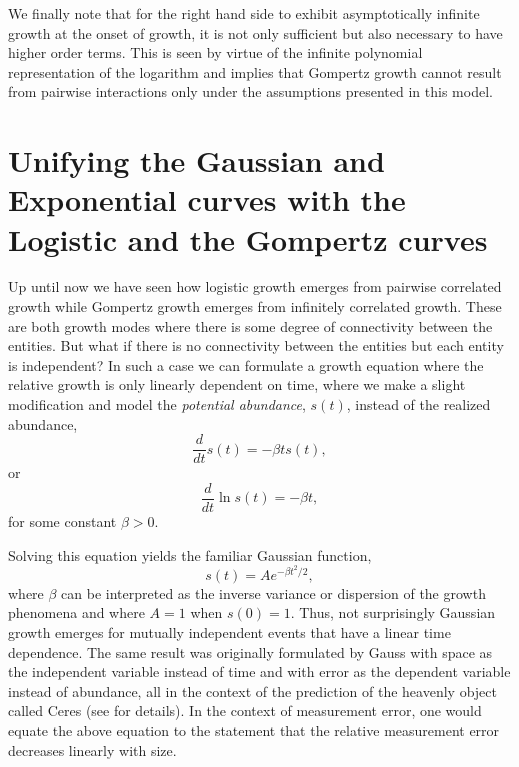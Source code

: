 \documentclass{article}
\begin{document}
We finally note that for the right hand side to exhibit asymptotically infinite growth at the onset of growth, it is not only sufficient but also necessary to have higher order terms. This is seen by virtue of the infinite polynomial representation of the logarithm and implies that Gompertz growth cannot result from pairwise interactions only under the assumptions presented in this model.

\section{Unifying the Gaussian and Exponential curves with the Logistic and the Gompertz curves}

Up until now we have seen how logistic growth emerges from pairwise correlated growth while Gompertz growth emerges from infinitely correlated growth. These are both growth modes where there is some degree of connectivity between the entities. But what if there is no connectivity between the entities but each entity is independent? In such a case we can formulate a growth equation where the relative growth is only linearly dependent on time, where we make a slight modification and model the \textit{potential abundance}, $s(t)$, instead of the realized abundance,
\begin{equation}
  \frac{d}{dt}s(t) = - \beta t s(t),
\end{equation}
or 
\begin{equation}
  \frac{d}{dt}\ln s(t) = - \beta t,
\end{equation}
for some constant $\beta>0$. 
 
Solving this equation yields the familiar Gaussian function, 
\begin{equation}
  s(t) = A e^{ - \beta t^2 / 2},
\end{equation}
where $\beta$ can be interpreted as the inverse variance or dispersion of the growth phenomena and where $A=1$ when $s(0)=1$. Thus, not surprisingly Gaussian growth emerges for mutually independent events that have a linear time dependence. The same result was originally formulated by Gauss with space as the independent variable instead of time and with error as the dependent variable instead of abundance, all in the context of the prediction of the heavenly object called Ceres \cite{gauss1857theory} (see \cite{stahl2006evolution} for details). In the context of measurement error, one would equate the above equation to the statement that the relative measurement error decreases linearly with size. 
\end{document}
